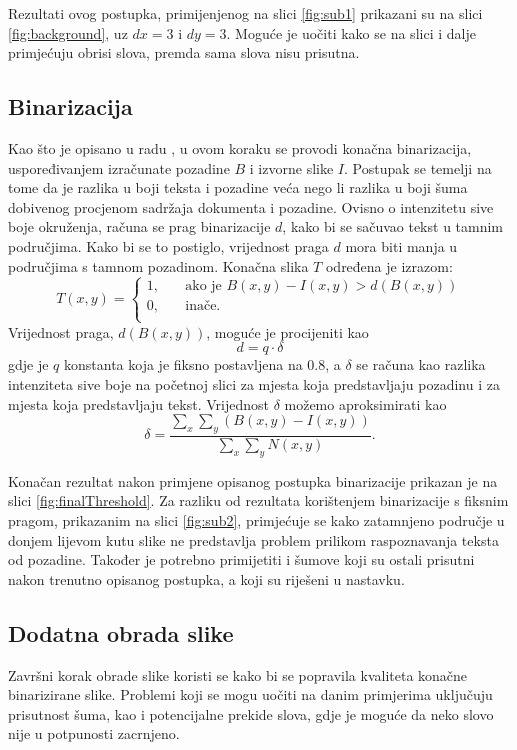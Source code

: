 \documentclass[times, utf8, zavrsni, numeric]{fer}
\begin{document}
Rezultati ovog postupka, primijenjenog  na slici \ref{fig:sub1} prikazani su na slici \ref{fig:background}, uz $dx=3$ i $dy=3$.
Moguće je uočiti kako se na slici i dalje primjećuju obrisi slova, premda sama slova nisu prisutna.

\subsection{Binarizacija}
Kao što je opisano u radu \cite{AdaptiveBinarization}, u ovom koraku se provodi konačna binarizacija, uspoređivanjem izračunate pozadine $B$ i izvorne slike $I$.
Postupak se temelji na tome da je razlika u boji teksta i pozadine veća nego li razlika u boji šuma dobivenog procjenom sadržaja dokumenta i pozadine.
Ovisno o intenzitetu sive boje okruženja, računa se prag binarizacije $d$, kako bi se sačuvao tekst u tamnim područjima.
Kako bi se to postiglo, vrijednost praga $d$ mora biti manja u područjima s tamnom pozadinom.
Konačna slika $T$ određena je izrazom:
\[
    T(x, y) = 
    \begin{cases}
    1,  & \quad \text{ako je } B(x, y) - I(x, y) > d(B(x, y)) \\
    0,  & \quad \text{inače}.\\
    \end{cases}
\]
Vrijednost praga, $d(B(x, y))$, moguće je procijeniti kao 
\[d = q \cdot \delta\]
gdje je $q$ konstanta koja je fiksno postavljena na $0.8$, a $\delta$ se računa kao razlika intenziteta sive boje na početnoj slici za mjesta koja predstavljaju pozadinu i za mjesta koja predstavljaju tekst.
Vrijednost $\delta$ možemo aproksimirati kao
\[
    \delta = \frac{
        \displaystyle \sum_x
        \displaystyle \sum_y
        (B(x, y) - I(x, y))
    }{
        \displaystyle \sum_x
        \displaystyle \sum_y
        N(x, y)
    }.
\]

Konačan rezultat nakon primjene opisanog postupka binarizacije prikazan je na slici \ref{fig:finalThreshold}.
Za razliku od rezultata korištenjem binarizacije s fiksnim pragom, prikazanim na slici \ref{fig:sub2}, primjećuje se kako zatamnjeno područje u donjem lijevom kutu slike ne predstavlja problem prilikom raspoznavanja teksta od pozadine.
Također je potrebno primijetiti i šumove koji su ostali prisutni nakon trenutno opisanog postupka, a koji su riješeni u nastavku.

\subsection{Dodatna obrada slike}
Završni korak obrade slike koristi se kako bi se popravila kvaliteta konačne binarizirane slike.
Problemi koji se mogu uočiti na danim primjerima uključuju prisutnost šuma, kao i potencijalne prekide slova, gdje je moguće da neko slovo nije u potpunosti zacrnjeno.\\
\end{document}
